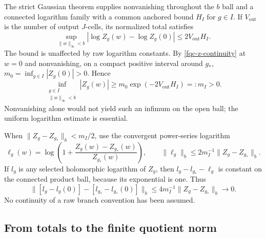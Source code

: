 \documentclass[11pt]{article}
\theoremstyle{remark}
\begin{document}
The strict Gaussian theorem supplies nonvanishing throughout
the $b$ ball and a connected logarithm family with a common
anchored bound $H_I$ for $g\in I$. If $V_{\mathrm{out}}$ is the
number of output $J$-cells, its normalized total satisfies
\begin{equation}
 \sup_{\lVert w\rVert_\infty<b}
  |\log Z_g(w)-\log Z_g(0)|
       \leq 2V_{\mathrm{out}}H_I.
 \label{fqc-log-bound}
\end{equation}
The bound is unaffected by raw logarithm constants.
By \eqref{fqc-z-continuity} at $w=0$ and nonvanishing, on a
compact positive interval around $g_*$,
$m_0=\inf_{g\in I}|Z_g(0)|>0$. Hence
\begin{equation}
 \inf_{\substack{g\in I\\\lVert w\rVert_\infty<b}}
       |Z_g(w)|
 \geq m_0\exp(-2V_{\mathrm{out}}H_I)=:m_I>0.
 \label{fqc-lower-bound}
\end{equation}
Nonvanishing alone would not yield such an infimum on the open
ball; the uniform logarithm estimate is essential.

When $\lVert Z_g-Z_{g_*}\rVert_b<m_I/2$, use the convergent
power-series logarithm
\begin{equation}
 \ell_g(w)=
 \log\left(1+\frac{Z_g(w)-Z_{g_*}(w)}{Z_{g_*}(w)}\right),
 \qquad
 \lVert\ell_g\rVert_b\leq
          2m_I^{-1}\lVert Z_g-Z_{g_*}\rVert_b.
 \label{fqc-log-ratio}
\end{equation}
If $l_g$ is any selected holomorphic logarithm of $Z_g$, then
$l_g-l_{g_*}-\ell_g$ is constant on the connected product ball,
because its exponential is one. Thus
\begin{equation}
 \bigl\lVert[l_g-l_g(0)]-[l_{g_*}-l_{g_*}(0)]\bigr\rVert_b
 \leq 4m_I^{-1}\lVert Z_g-Z_{g_*}\rVert_b
 \longrightarrow0.
 \label{fqc-normalized-log-continuity}
\end{equation}
No continuity of a raw branch convention has been assumed.

\subsection{From totals to the finite quotient norm}
\label{fqc-quotient-section}
\end{document}
